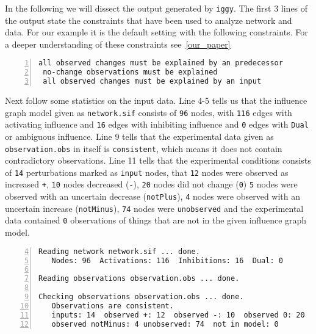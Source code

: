 \documentclass{article}
\newcommand\iggy{\texttt{iggy}}
\begin{document}
In the following we will dissect the output generated by \iggy.
The first 3 lines of the output state the constraints that have been used to analyze network and data.
For our example it is the default setting with the following constraints.
For a deeper understanding of these constraints see~\ref{our_paper}

\begin{Verbatim}[frame=single,numbers=left]
 all observed changes must be explained by an predecessor
 no-change observations must be explained
 all observed changes must be explained by an input
\end{Verbatim}

Next follow some statistics on the input data. 
Line 4-5 tells us that the influence graph model given as \texttt{network.sif} 
consists of \texttt{96} nodes, 
with \texttt{116} edges with activating influence 
and \texttt{16} edges with inhibiting influence
and \texttt{0} edges with \texttt{Dual} or ambiguous influence.
%
Line 9 tells that the experimental data given as \texttt{observation.obs} in itself is \texttt{consistent},
which means it does not contain contradictory observations.
Line 11 tells that the experimental conditions consists of \texttt{14} perturbations marked as \texttt{input} nodes, 
that \texttt{12} nodes were observed as increased \texttt{+}, 
\texttt{10} nodes decreased (\texttt{-}),
\texttt{20} nodes did not change (\texttt{0})
\texttt{5} nodes were observed with an uncertain decrease (\texttt{notPlus}),
\texttt{4} nodes were observed with an uncertain increase (\texttt{notMinus}),
\texttt{74} nodes were \texttt{unobserved} and the experimental data contained \texttt{0} observations of things that are not in the given influence graph model.

\begin{Verbatim}[frame=single,numbers=left,firstnumber=4] 
Reading network network.sif ... done.
   Nodes: 96  Activations: 116  Inhibitions: 16  Dual: 0

Reading observations observation.obs ... done.

Checking observations observation.obs ... done.
   Observations are consistent.
   inputs: 14  observed +: 12  observed -: 10  observed 0: 20  observed notPlus: 5  
   observed notMinus: 4 unobserved: 74  not in model: 0
\end{Verbatim}
\end{document}
